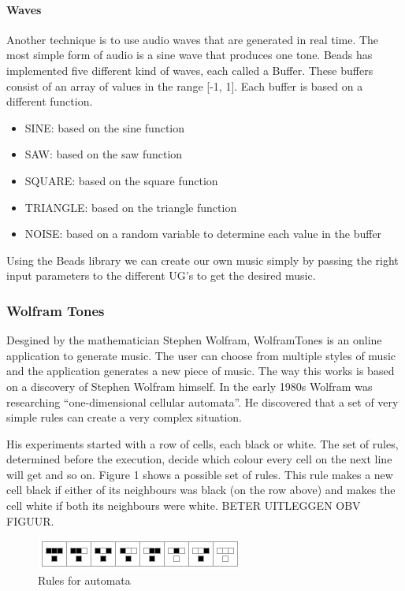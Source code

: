 \documentclass[12pt]{article}
\begin{document}
\paragraph{Waves}

Another technique is to use audio waves that are generated in real time. The most simple form of audio is a sine wave that produces one tone. Beads has implemented five different kind of waves, each called a Buffer. These buffers consist of an array of values in the range [-1, 1]. Each buffer is based on a different function.
\begin{itemize}
\item SINE:  based on the sine function
\item SAW: based on the saw function
\item SQUARE: based on the square function
\item TRIANGLE: based on the triangle function
\item NOISE: based on a random variable to determine each value in the buffer
\end{itemize} 

Using the Beads library we can create our own music simply by passing the right input parameters to the different UG's to get the desired music.

\subsubsection{Wolfram Tones}

Desgined by the mathematician Stephen Wolfram, WolframTones is an online application to generate music. The user can choose from multiple styles of music and the application generates a new piece of music. The way this works is based on a discovery of Stephen Wolfram himself. In the early 1980s Wolfram was researching ``one-dimensional cellular automata''. He discovered that a set of very simple rules can create a very complex situation. 

His experiments started with a row of cells, each black or white. The set of rules, determined before the execution, decide which colour every cell on the next line will get and so on. Figure 1 shows a possible set of rules. This rule makes a new cell black if either of its neighbours was black (on the row above) and makes the cell white if both its neighbours were white. BETER UITLEGGEN OBV FIGUUR.

\begin{figure}[h]
\centering
\includegraphics[]{img/wolframRules}
\caption{Rules for automata}
\end{figure}
\end{document}
